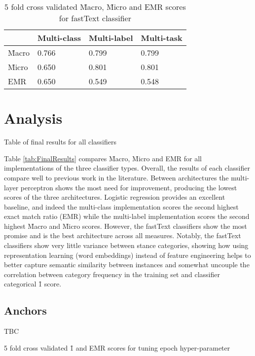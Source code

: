 \documentclass[Dissertation.tex]{subfiles}
\begin{document}
\begin{table}[]
	\centering
		\caption{5 fold cross validated \f{Macro}, \f{Micro} and EMR scores for fastText classifier}
		\label{tab:FT2}
	\begin{tabular}{@{}llll@{}}
		\toprule
		& Multi-class & Multi-label & Multi-task \\ \midrule
		\f{Macro} & 0.766       & 0.799       & 0.799      \\
		\f{Micro} & 0.650       & 0.801        & 0.801      \\
		EMR             & 0.650       & 0.549       & 0.548      \\ \bottomrule
	\end{tabular}
\end{table}
\section{Analysis}
\begin{table}
	\caption{Table of final results for all classifiers}
	\label{tab:FinalResults}
	\centering
	
\end{table}
Table \ref{tab:FinalResults} compares \f{Macro}, \f{Micro} and EMR for all implementations of the three classifier types. Overall, the results of each classifier compare well to previous work in the literature. Between architectures the multi-layer perceptron shows the most need for improvement, producing the lowest scores of the three architectures.  Logistic regression provides an excellent baseline, and indeed the multi-class implementation scores the second highest exact match ratio (EMR) while the multi-label implementation scores the second highest \f{Macro} and \f{Micro} scores. However, the fastText classifiers show the most promise and is the best architecture across all measures. Notably, the fastText classifiers show very little variance between stance categories, showing how using representation learning (word embeddings) instead of feature engineering helps to better capture semantic similarity between instances and somewhat uncouple the correlation between category frequency in the training set and classifier categorical \f{1} score.



\subsection{Anchors}
TBC
\begin{table}[h]
	\caption{5 fold cross validated \f{1} and EMR scores for tuning epoch hyper-parameter}
	\label{tab:crossValEpoch}
	\centering
	\begin{subfigure}{0.5\linewidth}
		\centering
			
	\end{subfigure}\hspace*{1em}\begin{subfigure}{0.5\linewidth}
		\centering
			
	\end{subfigure}
	
\end{table}
\end{document}
